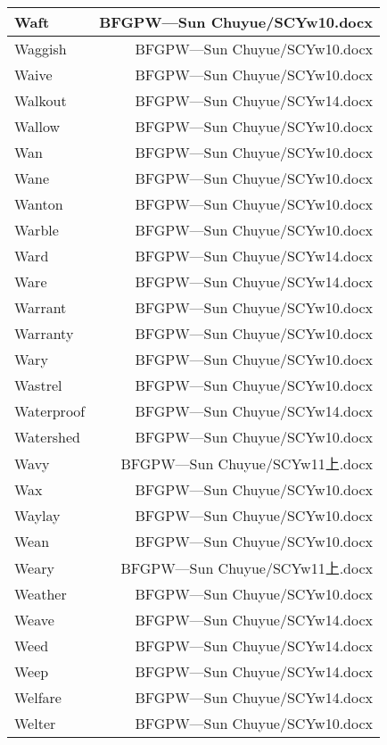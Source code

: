 \documentclass{article}
\begin{document}
\begin{center}
\begin{longtable}{|l|r|}
\hline
Waft  &  BFGPW---Sun Chuyue/SCYw10.docx\\  
\hline
Waggish  &  BFGPW---Sun Chuyue/SCYw10.docx\\  
\hline
Waive  &  BFGPW---Sun Chuyue/SCYw10.docx\\  
\hline
Walkout  &  BFGPW---Sun Chuyue/SCYw14.docx\\  
\hline
Wallow  &  BFGPW---Sun Chuyue/SCYw10.docx\\  
\hline
Wan  &  BFGPW---Sun Chuyue/SCYw10.docx\\  
\hline
Wane  &  BFGPW---Sun Chuyue/SCYw10.docx\\  
\hline
Wanton  &  BFGPW---Sun Chuyue/SCYw10.docx\\  
\hline
Warble  &  BFGPW---Sun Chuyue/SCYw10.docx\\  
\hline
Ward  &  BFGPW---Sun Chuyue/SCYw14.docx\\  
\hline
Ware  &  BFGPW---Sun Chuyue/SCYw14.docx\\  
\hline
Warrant  &  BFGPW---Sun Chuyue/SCYw10.docx\\  
\hline
Warranty  &  BFGPW---Sun Chuyue/SCYw10.docx\\  
\hline
Wary  &  BFGPW---Sun Chuyue/SCYw10.docx\\  
\hline
Wastrel  &  BFGPW---Sun Chuyue/SCYw10.docx\\  
\hline
Waterproof  &  BFGPW---Sun Chuyue/SCYw14.docx\\  
\hline
Watershed  &  BFGPW---Sun Chuyue/SCYw10.docx\\  
\hline
Wavy  &  BFGPW---Sun Chuyue/SCYw11上.docx\\  
\hline
Wax  &  BFGPW---Sun Chuyue/SCYw10.docx\\  
\hline
Waylay  &  BFGPW---Sun Chuyue/SCYw10.docx\\  
\hline
Wean  &  BFGPW---Sun Chuyue/SCYw10.docx\\  
\hline
Weary  &  BFGPW---Sun Chuyue/SCYw11上.docx\\  
\hline
Weather  &  BFGPW---Sun Chuyue/SCYw10.docx\\  
\hline
Weave  &  BFGPW---Sun Chuyue/SCYw14.docx\\  
\hline
Weed  &  BFGPW---Sun Chuyue/SCYw14.docx\\  
\hline
Weep  &  BFGPW---Sun Chuyue/SCYw14.docx\\  
\hline
Welfare  &  BFGPW---Sun Chuyue/SCYw14.docx\\  
\hline
Welter  &  BFGPW---Sun Chuyue/SCYw10.docx\\  
\hline

\end{longtable}
\end{center}
\end{document}
